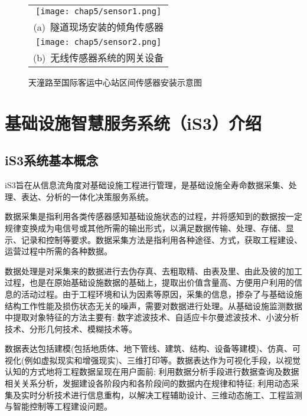 \begin{figure}[htbp] 
    \centering 
    \begin{tabular}{c} 
        \texttt{[image: chap5/sensor1.png]} \\ 
        (a)~隧道现场安装的倾角传感器 \\
        \texttt{[image: chap5/sensor2.png]} \\ 
        (b)~无线传感器系统的网关设备 \\
    \end{tabular}
    \caption{天潼路至国际客运中心站区间传感器安装示意图}
    \label{fig:天潼路至国际客运中心站区间传感器安装示意图} 
\end{figure}

\section{基础设施智慧服务系统（iS3）介绍}

\subsection{iS3系统基本概念}

iS3旨在从信息流角度对基础设施工程进行管理，是基础设施全寿命数据采集、处理、表达、分析的一体化决策服务系统。

数据采集是指利用各类传感器感知基础设施状态的过程，并将感知到的数据按一定规律变换成为电信号或其他所需的输出形式，以满足数据传输、处理、存储、显示、记录和控制等要求。数据采集方法是指利用各种途径、方式，获取工程建设、运营过程中所需的各种数据。

数据处理是对采集来的数据进行去伪存真、去粗取精、由表及里、由此及彼的加工过程，也是在原始基础设施数据的基础上，提取出价值含量高、方便用户利用的信息的活动过程。由于工程环境和认为因素等原因，采集的信息，掺杂了与基础设施结构工作性能及损伤状态无关的噪声，需要对数据进行处理。从基础设施监测数据中提取对象特征的方法主要有: 数字滤波技术、自适应卡尔曼滤波技术、小波分析技术、分形几何技术、模糊技术等。

数据表达包括建模(包括地质体、地下管线、建筑、结构、设备等建模)、仿真、可视化(例如虚拟现实和增强现实)、三维打印等。数据表达作为可视化手段，以视觉认知的方式地将工程数据呈现在用户面前; 利用数据分析手段进行数据查询及数据相关关系分析，发掘建设各阶段内和各阶段间的数据内在规律和特征; 利用动态采集及实时分析技术进行信息重构，以解决工程辅助设计、三维动态施工、工程监测与智能控制等工程建设问题。

